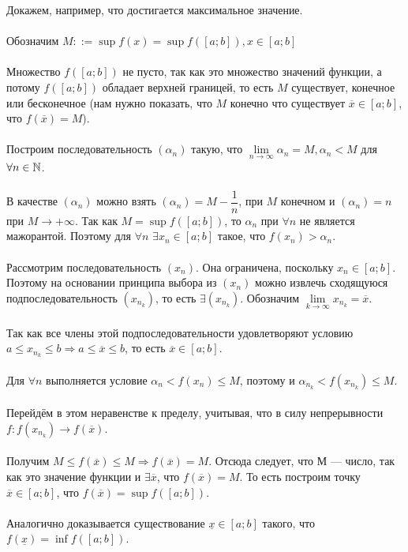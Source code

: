 \begin{Proof}
	Докажем, например, что достигается максимальное значение. \\\\
	Обозначим $M::= \sup{f(x)} = \sup f([a;b]), x \in [a;b] $ \\\\
	Множество $f([a;b])$ не пусто, так как это множество значений функции, а потому $f([a;b])$ обладает верхней границей, то есть $M$ существует, конечное или бесконечное (нам нужно показать, что $M$ конечно что существует $\overline{x} \in [a;b]$, что $f(\overline{x}) = M$). \\\\
	Построим последовательность $(\alpha_n)$ такую, что $\lim\limits_{n\rightarrow \infty}\alpha_n = M, \alpha_n < M$ для $\forall n \in \mathbb{N}$. \\\\
	В качестве $(\alpha_n)$ можно взять $(\alpha_n) = M - \dfrac{1}{n}$, при $M$ конечном и $(\alpha_n) = n$ при $M\rightarrow +\infty$. 
	Так как $M = \sup f([a;b])$, то $\alpha_n$ при $\forall n$ не является мажорантой. Поэтому для $\forall n$ $\exists x_n \in [a;b]$ такое, что $f(x_n) > \alpha_n$. \\\\
	Рассмотрим последовательность $(x_n)$. Она ограничена, поскольку 
	$x_n \in [a;b]$. Поэтому на основании принципа выбора из $(x_n)$ можно извлечь сходящуюся подпоследовательность $(x_{n_{k}})$, то есть $\exists (x_{n_{k}})$. Обозначим $\lim\limits_{k\rightarrow \infty}x_{n_{k}} = \overline{x}$. \\\\
	Так как все члены этой подпоследовательности удовлетворяют условию $a \leqslant x_{n_{k}} \leqslant b \Rightarrow a \leqslant \overline{x} \leqslant b$, то есть $\overline{x} \in [a;b]$.\\\\
	Для $\forall n$ выполняется условие $\alpha_n < f(x_n) \leqslant M$, поэтому и $\alpha_{n_{k}} < f(x_{n_{k}}) \leqslant M$. \\\\
	Перейдём в этом неравенстве к пределу, учитывая, что в силу непрерывности $f : f(x_{n_{k}}) \rightarrow f(\overline{x})$. \\\\
	Получим $M \leqslant f(\overline{x}) \leqslant M \Rightarrow f(\overline{x}) = M$. Отсюда следует, что М --- число, так как это значение функции и $\exists \overline{x}$, что $f(\overline{x}) = M$. То есть построим точку $\overline{x} \in [a;b]$, что $f(\overline{x}) = \sup f([a;b])$.\\\\ Аналогично доказывается существование $\underline{x} \in [a;b]$ такого, что $f(\underline{x}) = \inf f([a;b])$. 
\end{Proof}\\\\
